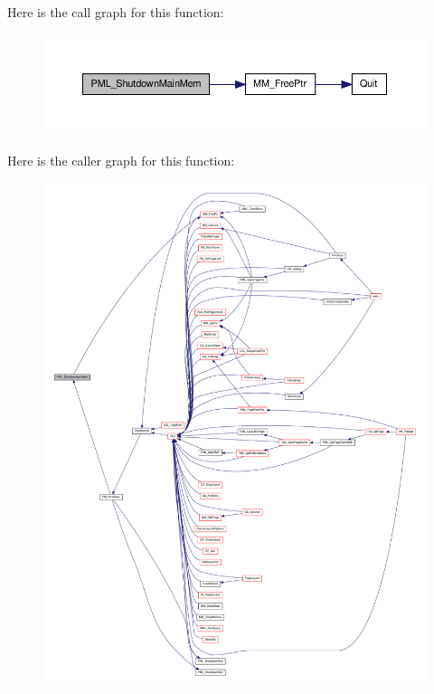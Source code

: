 Here is the call graph for this function:
\nopagebreak
\begin{figure}[H]
\begin{center}
\leavevmode
\includegraphics[width=388pt]{ID__PM_8C_a788c597ebc679e6114cafede80c05388_cgraph}
\end{center}
\end{figure}




Here is the caller graph for this function:
\nopagebreak
\begin{figure}[H]
\begin{center}
\leavevmode
\includegraphics[width=400pt]{ID__PM_8C_a788c597ebc679e6114cafede80c05388_icgraph}
\end{center}
\end{figure}


